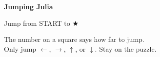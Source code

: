 \documentclass[12pt]{article}
\begin{document}
\pagestyle{empty}

\begin{center}
{\Huge\bfseries Jumping Julia}

\vspace{0.3cm}

{\Large Jump from START to {\Huge $\bigstar$}}

\vspace{5mm}

{\Large The number on a square says how far to jump. \\
  \vspace{5mm}
Only jump $\leftarrow$, $\rightarrow$, $\uparrow$, or $\downarrow$.
Stay on the puzzle.}
\end{center}

\vspace{0.5cm}

\newcommand{\drawpuzzle}[2]{
\begin{tikzpicture}[scale=1.2]
  \node[font=\large\bfseries] at (2.9, 2.2) {#1};
  \foreach \row in {0,1,2,3} {
    \foreach \col in {0,1,2,3} {
      \pgfmathtruncatemacro{\idx}{\row*4+\col}
      \pgfmathsetmacro{\val}{#2[\idx]}

      \ifnum\row=0
        \ifnum\col=0
          \def\fillcol{startgreen}
        \else
          \def\fillcol{white}
        \fi
      \else
        \ifnum\row=3
          \ifnum\col=3
            \def\fillcol{goalyellow}
          \else
            \def\fillcol{white}
          \fi
        \else
          \def\fillcol{white}
        \fi
      \fi

      \draw[line width=2pt, fill=\fillcol] (\col*1.5, -\row*1.5) rectangle +(1.3, 1.3);

      \pgfmathtruncatemacro{\valint}{\val}
      \ifnum\row=3
        \ifnum\col=3
          \node at (\col*1.5+0.65, -\row*1.5+0.65) {\Huge $\bigstar$};
        \else
          \node[font=\sffamily\bfseries\Huge] at (\col*1.5+0.65, -\row*1.5+0.65) {\valint};
        \fi
      \else
        \node[font=\sffamily\bfseries\Huge] at (\col*1.5+0.65, -\row*1.5+0.65) {\valint};
      \fi

      \ifnum\row=0
        \ifnum\col=0
          \node[font=\tiny\bfseries] at (\col*1.5+0.65, -\row*1.5+1.15) {START};
        \fi
      \fi
    }
  }
\end{tikzpicture}
}
\end{document}
